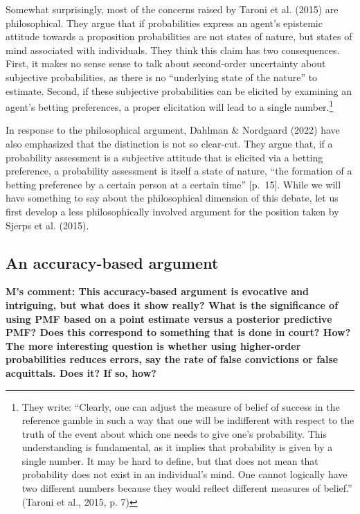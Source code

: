 \documentclass[
  10pt,
  dvipsnames,enabledeprecatedfontcommands]{scrartcl}
\begin{document}
Somewhat surprisingly, most of the concerns raised by Taroni et al.
(2015) are philosophical. They argue that if probabilities express an
agent's epistemic attitude towards a proposition probabilities are not
states of nature, but states of mind associated with individuals. They
think this claim has two consequences. First, it makes no sense sense to
talk about second-order uncertainty about subjective probabilities, as
there is no ``underlying state of the nature'' to estimate. Second, if
these subjective probabilities can be elicited by examining an agent's
betting preferences, a proper elicitation will lead to a single
number.\footnote{They write: ``Clearly, one can adjust the measure of
  belief of success in the reference gamble in such a way that one will
  be indifferent with respect to the truth of the event about which one
  needs to give one's probability. This understanding is fundamental, as
  it implies that probability is given by a single number. It may be
  hard to define, but that does not mean that probability does not exist
  in an individual's mind. One cannot logically have two different
  numbers because they would reflect different measures of belief.''
  (Taroni et al., 2015, p. 7)}

In response to the philosophical argument, Dahlman \& Nordgaard (2022)
have also emphasized that the distinction is not so clear-cut. They
argue that, if a probability assessment is a subjective attitude that is
elicited via a betting preference, a probability assessment is itself a
state of nature, ``the formation of a betting preference by a certain
person at a certain time'' {[}p.~15{]}. While we will have something to
say about the philosophical dimension of this debate, let us first
develop a less philosophically involved argument for the position taken
by Sjerps et al. (2015).

\hypertarget{an-accuracy-based-argument}{%
\subsection{An accuracy-based
argument}\label{an-accuracy-based-argument}}


\textbf{M's comment: This accuracy-based argument is evocative and intriguing, but what does it show really? What is the significance of using PMF based on a point estimate versus a posterior predictive PMF? Does this correspond to something that is done in court? How? The more interesting question is whether using higher-order probabilities reduces errors, say the rate of false convictions or false acquittals. Does it? If so, how?}
\end{document}
